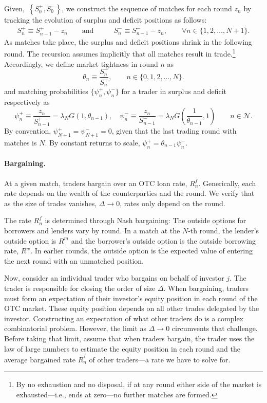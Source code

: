 \documentclass[12pt,american,english,notitlepage]{article}
\begin{document}
Given,\ $\left\{ S_{0}^{+},S_{0}^{-}\right\}$, we construct the sequence of matches for each round $z_{n}$ by tracking the evolution of surplus and deficit positions as follows:
\begin{align*}
S_{n}^{+}\equiv S_{n-1}^{+}-z_{n}\qquad\text{and}\qquad & S_{n}^{-}\equiv S_{n-1}^{-}-z_{n},\qquad\forall n\in\{1,2,\dots,N+1\}.
\end{align*}
As matches take place, the surplus and deficit positions shrink in the following round. The recursion assumes implicitly that all matches result in trade.\footnote{By no exhaustion and no disposal, if at any round either side of the
market is exhausted---i.e., ends at zero---no further matches are formed.} Accordingly, we define market tightness in round $n$ as
\begin{equation}
\theta_{n}\equiv\frac{S_{n}^{-}}{S_{n}^{+}},\qquad n\in\{0,1,2,\dots,N\}.\label{eq:theta}
\end{equation}
and matching probabilities $\{\psi_{n}^{+},\psi_{n}^{-}\}$ for a trader in surplus and deficit respectively as
\begin{equation}
\psi_{n}^{+}\equiv\frac{z_{n}}{S_{n-1}^{+}}=\lambda_{N}G\left(1,\theta_{n-1}\right),\quad\psi_{n}^{-}\equiv\frac{z_{n}}{S_{n-1}^{-}}=\lambda_{N}G\left(\frac{1}{\theta_{n-1}},1\right)\qquad n\in\mathcal{N}.\label{eq:matching.probs}
\end{equation}
By convention, $\psi_{N+1}^{+}=\psi_{N+1}^{-}=0$, given that the last trading round with matches is $N$. By constant returns to scale, $\psi_{n}^{+}=\theta_{n-1}\psi_{n}^{-}$.

\paragraph*{Bargaining.}

At a given match, traders bargain over an OTC loan rate, $R_{n}^{f}$. Generically, each rate depends on the wealth of the counterparties and the round. We verify that as the size of trades vanishes, $\Delta\rightarrow0$, rates only depend on the round.

The rate $R_{n}^{f}$ is determined through Nash bargaining: The outside options for borrowers and lenders vary by round. In a match at the $N$-th round, the lender's outside option is $R^{m}$ and the borrower's outside option is the outside borrowing rate, $R^{w}$. In earlier rounds, the outside option is the expected value of entering the next round with an unmatched position.

Now, consider an individual trader who bargains on behalf of investor $j$. The trader is responsible for closing the order of size $\Delta$. When bargaining, traders must form an expectation of their investor's
equity position in each round of the OTC market. These equity position depends on all other trades delegated by the investor. Constructing an expectation of what other traders do is a complex combinatorial problem. However, the limit as $\Delta\rightarrow0$ circumvents that challenge. Before taking that limit, assume that when traders bargain,
the trader uses the law of large numbers to estimate the equity position in each round and the average bargained rate $\overline{R}_{n}^{f}$ of other traders---a rate we have to solve for.
\end{document}
